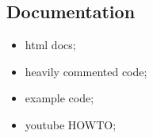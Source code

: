 \subsection{Documentation}
\begin{itemize}
\item html docs;
\item heavily commented code; 
\item example code;
\item youtube HOWTO;
\end{itemize}
